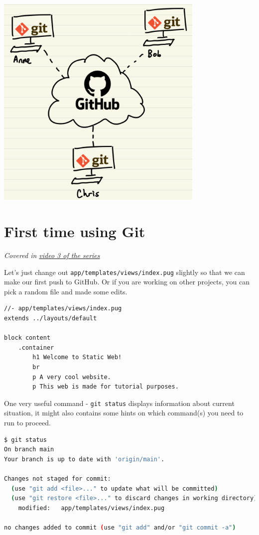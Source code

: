 \begin{center}
\includegraphics[width=10cm]{images/ch3-gitgithub.png}
\end{center}

\section{First time using Git}
\label{sec:gitfirst}

\textit{Covered in \href{https://www.youtube.com/watch?v=wQmFz-Ggxuo&list=PLjGmdnqrOKuYXiu7lgG5HW71jPEUd1XCm&index=4}{video 3 of the series}}
\vspace{6mm}

Let's just change out \texttt{app/templates/views/index.pug} slightly so that we can make our first push to GitHub. Or if you are working on other projects, you can pick a random file and made some edits.

\begin{lstlisting}[language=pug]
//- app/templates/views/index.pug
extends ../layouts/default

block content
	.container
		h1 Welcome to Static Web!
		br
		p A very cool website.
		p This web is made for tutorial purposes.
\end{lstlisting}

One very useful command - \texttt{git status} displays information about current situation, it might also contains some hints on which command(s) you need to run to proceed.

\begin{lstlisting}[language=bash]
$ git status
On branch main
Your branch is up to date with 'origin/main'.

Changes not staged for commit:
  (use "git add <file>..." to update what will be committed)
  (use "git restore <file>..." to discard changes in working directory)
	modified:   app/templates/views/index.pug

no changes added to commit (use "git add" and/or "git commit -a")
\end{lstlisting}

